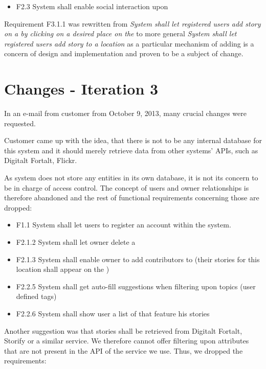\documentclass[11pt]{book}
\begin{document}
\begin{itemize}
  \item F2.3 System shall enable social interaction upon \wallentityp
\end{itemize}

Requirement F3.1.1 was rewritten from \emph{System shall let registered
users add story on a \wallentitys by clicking on a desired place on the \wallentitys} to
more general \emph{System shall let registered users add story to a
location} as a particular mechanism of adding \wallentityp is a concern of
design and implementation and proven to be a subject of change.

\section{Changes - Iteration 3}\label{changes---iteration-3}

In an e-mail from customer from October 9, 2013, many crucial changes
were requested.

Customer came up with the idea, that there is not to be any internal
database for this system and it should merely retrieve data from other
systems' APIs, such as Digitalt Fortalt, Flickr.

As system does not store any entities in its own database, it is not its
concern to be in charge of access control. The concept of users and
owner relationships is therefore abandoned and the rest of functional
requirements concerning those are dropped:

\begin{itemize}
  \item F1.1 System shall let users to register an account within the system.
  \item F2.1.2 System shall let owner delete a \wallentitys
  \item F2.1.3 System shall enable owner to add contributors to \wallentitys (their
  stories for this location shall appear on the \wallentitys)
  \item F2.2.5 System shall get auto-fill suggestions when filtering upon
  topics (user defined tags)
  \item F2.2.6 System shall show user a list of \wallentityp that feature his stories
\end{itemize}

Another suggestion was that stories shall be retrieved from
Digitalt Fortalt, Storify or a similar service. We
therefore cannot offer filtering upon attributes that are not present in
the API of the service we use. Thus, we dropped the requirements:
\end{document}
